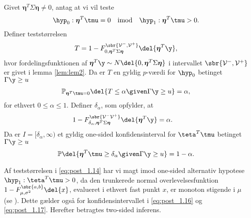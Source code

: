 \begin{lem} \label{lem:lem3}
Givet \(\boldsymbol{\eta}^T \Sigma \boldsymbol{\eta} \neq 0\), antag at vi vil teste
\begin{align*}
\hyp_0: \boldsymbol{\eta}^T \tmu=0 \quad \text{imod} \quad \hyp_1: \boldsymbol{\eta}^T \tmu > 0.
\end{align*}
Definer teststørrelsen
\begin{align}
T=1- F_{0, \boldsymbol{\eta}^T \Sigma \boldsymbol{\eta}}^{\sbr{\mathcal{V}^-, \mathcal{V}^+}} \del{\boldsymbol{\eta}^T \y}, \label{eq:post_1.14}
\end{align}
hvor fordelingsfunktionen af \(\boldsymbol{\eta}^T \y \sim N \del{0,  \boldsymbol{\eta}^T \Sigma \boldsymbol{\eta}}\) i intervallet \(\sbr{\mathcal{V}^-, \mathcal{V}^+}\) er givet i lemma \ref{lem:lem2}.
Da er \(T\) en gyldig \(p\)-værdi for \(\hyp_0\) betinget \(\Gamma \y \geq u\)
\begin{align}
\mathbb{P}_{\boldsymbol{\eta}^T \tmu=0} \del{T \leq \alpha \given \Gamma \y \geq u} = \alpha, \label{eq:post_1.15}
\end{align}
for ethvert \(0 \leq \alpha \leq 1\). 
Definer \(\delta_{\alpha}\), som opfylder, at
\begin{align}
1-F_{\delta_{\alpha}, \boldsymbol{\eta}^T \Sigma \boldsymbol{\eta}}^{\sbr{\mathcal{V}^- \mathcal{V}^+}} \del{\boldsymbol{\eta}^T \y} &= \alpha. \label{eq:post_1.16}
\end{align}
Da er \(I= [\delta_\alpha, \infty )\) et gyldig one-sided konfidensinterval for \(\teta^T \tmu\) betinget \(\Gamma \y \geq u\)
\begin{align}
\mathbb{P} \del{\boldsymbol{\eta}^T \tmu \geq \delta_\alpha \given \Gamma \y \geq u} = 1- \alpha. \label{eq:post_1.17}
\end{align}
\end{lem}
%
Af teststørrelsen i \eqref{eq:post_1.14} har vi magt imod one-sided alternativ hypotese \(\hyp_1 : \teta^T \tmu > 0\), da den trunkerede normal overlevelsesfunktion \(1-F_{\mu, \sigma^2}^{\sbr{a,b}} \del{x}\), evalueret i ethvert fast punkt \(x\), er monoton stigende i \(\mu\) (se ).
Dette gælder også for konfidensintervallet i \eqref{eq:post_1.16} og \eqref{eq:post_1.17}.
Herefter betragtes two-sided inferens.
%
